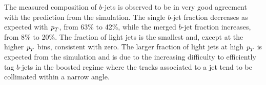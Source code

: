 The measured composition of $b$-jets is observed to be in very good agreement with the prediction from the simulation. The single $b$-jet fraction decreases as expected with ${\emph{p}_{T}}$, from 63\% to 42\%, while the merged $b$-jet fraction increases, from 8\% to 20\%. The fraction of light jets is the smallest and, except at the higher ${\emph{p}_{T}}$ bins, consistent with zero. The larger fraction of light jets at high ${\emph{p}_{T}}$ is expected from the simulation and is due to the increasing difficulty to efficiently tag $b$-jets in the boosted regime where the tracks associated to a jet tend to be collimated within a narrow angle.




